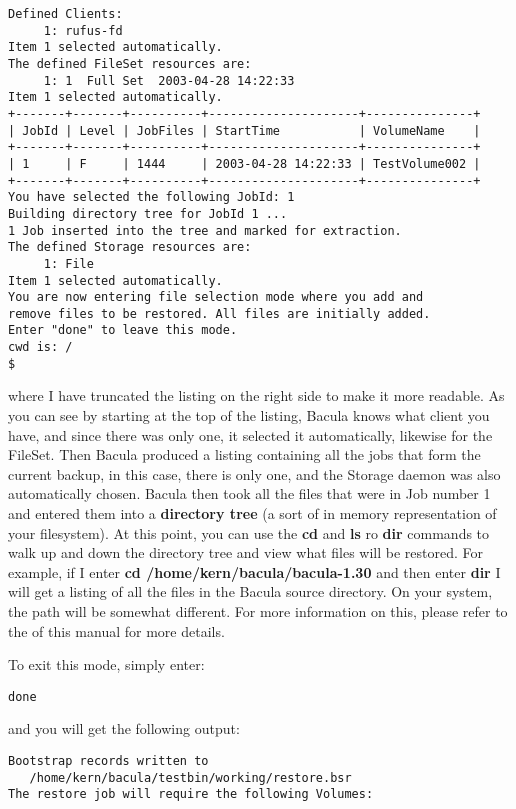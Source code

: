 {{\footnotesize
\begin{verbatim}
Defined Clients:
     1: rufus-fd
Item 1 selected automatically.
The defined FileSet resources are:
     1: 1  Full Set  2003-04-28 14:22:33
Item 1 selected automatically.
+-------+-------+----------+---------------------+---------------+
| JobId | Level | JobFiles | StartTime           | VolumeName    |
+-------+-------+----------+---------------------+---------------+
| 1     | F     | 1444     | 2003-04-28 14:22:33 | TestVolume002 |
+-------+-------+----------+---------------------+---------------+
You have selected the following JobId: 1
Building directory tree for JobId 1 ...
1 Job inserted into the tree and marked for extraction.
The defined Storage resources are:
     1: File
Item 1 selected automatically.
You are now entering file selection mode where you add and
remove files to be restored. All files are initially added.
Enter "done" to leave this mode.
cwd is: /
$
\end{verbatim}
\normalsize

where I have truncated the listing on the right side to make it more readable.
As you can see by starting at the top of the listing, Bacula knows what client
you have, and since there was only one, it selected it automatically, likewise
for the FileSet. Then Bacula produced a listing containing all the jobs that
form the current backup, in this case, there is only one, and the Storage
daemon was also automatically chosen. Bacula then took all the files that were
in Job number 1 and entered them into a {\bf directory tree} (a sort of in
memory representation of your filesystem). At this point, you can use the {\bf
cd} and {\bf ls} ro {\bf dir} commands to walk up and down the directory tree
and view what files will be restored. For example, if I enter {\bf cd
/home/kern/bacula/bacula-1.30} and then enter {\bf dir} I will get a listing
of all the files in the Bacula source directory. On your system, the path will
be somewhat different. For more information on this, please refer to the 
 of this manual for
more details. 

To exit this mode, simply enter: 

\footnotesize
\begin{verbatim}
done
\end{verbatim}
\normalsize

and you will get the following output: 

\footnotesize
\begin{verbatim}
Bootstrap records written to
   /home/kern/bacula/testbin/working/restore.bsr
The restore job will require the following Volumes:
   

\end{verbatim}}}

